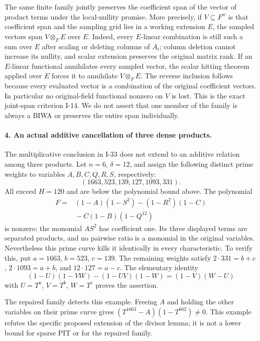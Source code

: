 \documentclass[11pt,a4paper]{article}
\theoremstyle{definition}\newtheorem{definition}{Definition}
\begin{document}
The same finite family jointly preserves the coefficient
span of the vector of product terms under the local-nullity
promise. More precisely, if $V\subseteq F^w$ is that
coefficient span and the sampling grid lies in a working
extension $E$, the sampled vectors span $V\otimes_F E$
over $E$. Indeed, every $E$-linear combination is still
such a sum over $E$ after scaling or deleting columns of
$A_i$; column deletion cannot increase its nullity, and
scalar extension preserves the original matrix rank.
If an $E$-linear functional annihilates every sampled vector,
the scalar hitting theorem applied over $E$ forces it to
annihilate $V\otimes_F E$. The reverse inclusion follows
because every evaluated vector is a combination of the
original coefficient vectors. In particular no original-field
functional nonzero on $V$ is lost. This is the exact
joint-span criterion I-14. We do not assert that one member
of the family is always a BIWA or preserves the entire span
individually.

\paragraph{4. An actual additive cancellation of three dense products.}
The multiplicative conclusion in I-33 does not extend to an
additive relation among three products. Let $n=6$, $\delta=12$,
and assign the following distinct prime weights to variables
$A,B,C,Q,R,S$, respectively:
\[
 (1663,523,139,127,1093,331).
\]
All exceed $H=120$ and are below the polynomial bound above.
The polynomial
\[
 \begin{aligned}
 F={}&(1-A)(1-S^2)-(1-R^2)(1-C)\\
     &{}-C(1-B)(1-Q^{12})
 \end{aligned}
\]
is nonzero: the monomial $AS^2$ has coefficient one.
Its three displayed terms are separated products, and no
pairwise ratio is a monomial in the original variables.
Nevertheless this prime curve kills it identically in every
characteristic. To verify this, put $a=1663$, $b=523$,
$c=139$. The remaining weights satisfy
$2\cdot331=b+c$, $2\cdot1093=a+b$, and
$12\cdot127=a-c$. The elementary identity
\[
 (1-U)(1-VW)-(1-UV)(1-W)=(1-V)(W-U)
\]
with $U=T^a$, $V=T^b$, $W=T^c$ proves the assertion.

The repaired family detects this example. Freeing $A$ and
holding the other variables on their prime curve gives
$(T^{1663}-A)(1-T^{662})\ne0$. This example refutes the
specific proposed extension of the divisor lemma; it is
not a lower bound for sparse PIT or for the repaired family.
\end{document}
